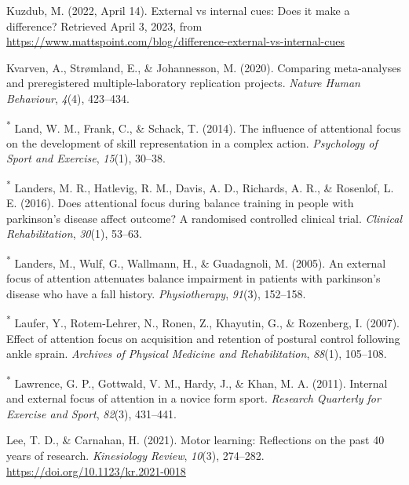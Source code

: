\documentclass[
  man, donotrepeattitle,floatsintext]{apa7}
\newlength{\cslhangindent}
\newlength{\cslentryspacingunit} %
\newenvironment{CSLReferences}[2] %
 {%
  \setlength{\parindent}{0pt}
  \ifodd #1
  \let\oldpar\par
  \def\par{\hangindent=\cslhangindent\oldpar}
  \fi
  \setlength{\parskip}{#2\cslentryspacingunit}
 }%
 {}
\begin{document}
\begin{CSLReferences}{1}{0}
\leavevmode{}%
Kuzdub, M. (2022, April 14). External vs internal cues: {Does} it make a difference? Retrieved April 3, 2023, from \url{https://www.mattspoint.com/blog/difference-external-vs-internal-cues}

\leavevmode{}%
Kvarven, A., Strømland, E., \& Johannesson, M. (2020). Comparing meta-analyses and preregistered multiple-laboratory replication projects. \emph{Nature Human Behaviour}, \emph{4}(4), 423--434.

\leavevmode{}%
\textsuperscript{*} Land, W. M., Frank, C., \& Schack, T. (2014). The influence of attentional focus on the development of skill representation in a complex action. \emph{Psychology of Sport and Exercise}, \emph{15}(1), 30--38.

\leavevmode{}%
\textsuperscript{*} Landers, M. R., Hatlevig, R. M., Davis, A. D., Richards, A. R., \& Rosenlof, L. E. (2016). Does attentional focus during balance training in people with parkinson's disease affect outcome? A randomised controlled clinical trial. \emph{Clinical Rehabilitation}, \emph{30}(1), 53--63.

\leavevmode{}%
\textsuperscript{*} Landers, M., Wulf, G., Wallmann, H., \& Guadagnoli, M. (2005). An external focus of attention attenuates balance impairment in patients with parkinson's disease who have a fall history. \emph{Physiotherapy}, \emph{91}(3), 152--158.

\leavevmode{}%
\textsuperscript{*} Laufer, Y., Rotem-Lehrer, N., Ronen, Z., Khayutin, G., \& Rozenberg, I. (2007). Effect of attention focus on acquisition and retention of postural control following ankle sprain. \emph{Archives of Physical Medicine and Rehabilitation}, \emph{88}(1), 105--108.

\leavevmode{}%
\textsuperscript{*} Lawrence, G. P., Gottwald, V. M., Hardy, J., \& Khan, M. A. (2011). Internal and external focus of attention in a novice form sport. \emph{Research Quarterly for Exercise and Sport}, \emph{82}(3), 431--441.

\leavevmode{}%
Lee, T. D., \& Carnahan, H. (2021). Motor learning: {Reflections} on the past 40 years of research. \emph{Kinesiology Review}, \emph{10}(3), 274--282. \url{https://doi.org/10.1123/kr.2021-0018}


\end{CSLReferences}
\end{document}
